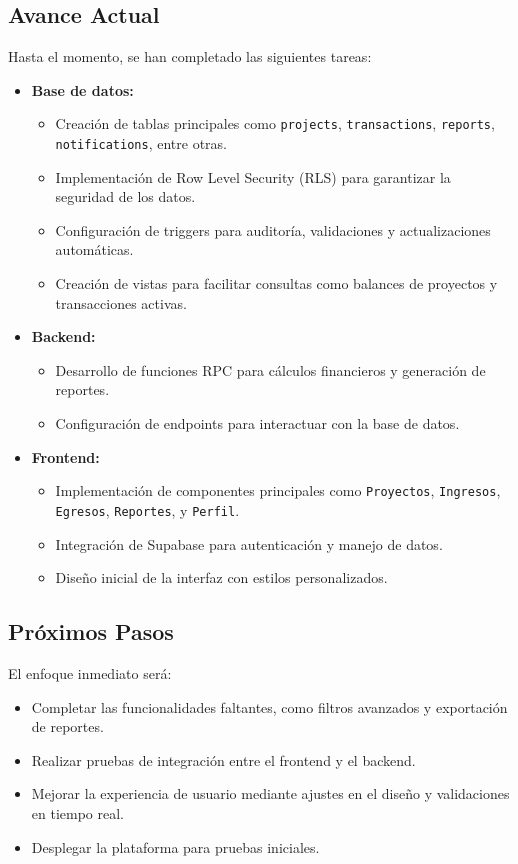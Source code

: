 \subsection{Avance Actual}
Hasta el momento, se han completado las siguientes tareas:
\begin{itemize}
    \item \textbf{Base de datos:}
    \begin{itemize}
        \item Creación de tablas principales como \texttt{projects}, \texttt{transactions}, \texttt{reports}, \texttt{notifications}, entre otras.
        \item Implementación de Row Level Security (RLS) para garantizar la seguridad de los datos.
        \item Configuración de triggers para auditoría, validaciones y actualizaciones automáticas.
        \item Creación de vistas para facilitar consultas como balances de proyectos y transacciones activas.
    \end{itemize}
    \item \textbf{Backend:}
    \begin{itemize}
        \item Desarrollo de funciones RPC para cálculos financieros y generación de reportes.
        \item Configuración de endpoints para interactuar con la base de datos.
    \end{itemize}
    \item \textbf{Frontend:}
    \begin{itemize}
        \item Implementación de componentes principales como \texttt{Proyectos}, \texttt{Ingresos}, \texttt{Egresos}, \texttt{Reportes}, y \texttt{Perfil}.
        \item Integración de Supabase para autenticación y manejo de datos.
        \item Diseño inicial de la interfaz con estilos personalizados.
    \end{itemize}
\end{itemize}

\subsection{Próximos Pasos}
El enfoque inmediato será:
\begin{itemize}
    \item Completar las funcionalidades faltantes, como filtros avanzados y exportación de reportes.
    \item Realizar pruebas de integración entre el frontend y el backend.
    \item Mejorar la experiencia de usuario mediante ajustes en el diseño y validaciones en tiempo real.
    \item Desplegar la plataforma para pruebas iniciales.
\end{itemize}